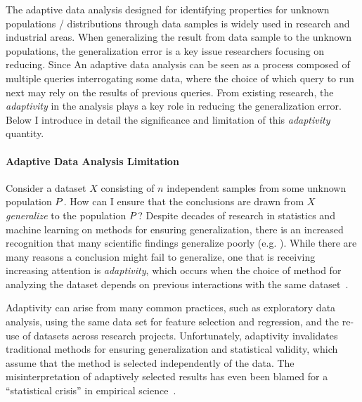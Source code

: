 The adaptive data analysis designed for identifying  properties for unknown populations / distributions 
through data samples is widely 
used in research and industrial areas.
When generalizing the result from data sample to the unknown populations, 
the generalization error is a key issue researchers focusing on reducing.
Since An adaptive data analysis can be seen as a process composed of multiple queries interrogating some data, 
where the choice of which query to run next may rely on the results of previous queries. 
From existing research, the \emph{adaptivity} in the analysis plays a key role in reducing the generalization error.
Below I introduce in detail the significance and limitation of this \emph{adaptivity} quantity.
\paragraph{Adaptive Data Analysis Limitation}
\label{subsec:intro-motivation}
Consider a dataset $X$ consisting of $n$ independent samples from some unknown population $P$. How can I ensure that the conclusions are drawn from $X$ \emph{generalize} to the population $P$? Despite decades of research in statistics and machine learning on methods for ensuring generalization, there is an increased recognition that many scientific findings generalize poorly (e.g. 
\cite{Ioannidis05,GelmanL13}
). While there are many reasons a conclusion might fail to generalize, one that is receiving increasing attention is \emph{adaptivity}, which occurs when the choice of method for analyzing the dataset depends on previous interactions with the same dataset~\cite{GelmanL13}.

 Adaptivity can arise from many common practices, such as exploratory data analysis, using the same data set for feature selection and regression, and the re-use of datasets across research projects. Unfortunately, adaptivity invalidates traditional methods for ensuring generalization and statistical validity, which assume that the method is selected independently of the data. The misinterpretation of adaptively selected results has even been blamed for a ``statistical crisis'' in empirical science~\cite{GelmanL13}.

